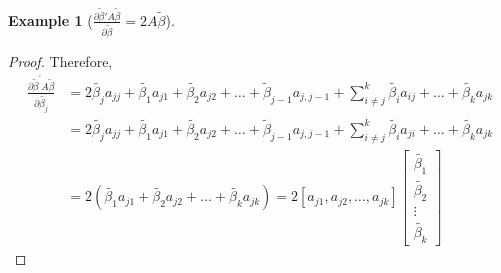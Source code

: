\documentclass[12pt, a4paper]{article}
\theoremstyle{definition}
\newtheorem{example}{Example}
\begin{document}
\begin{example}[$\frac{\partial \tilde{\beta}'A\tilde{\beta}}{\partial \tilde{\beta}}=2A\tilde{\beta}$]
\begin{proof}
 Therefore, 
 \begin{align*}
 \frac{\partial{\tilde{\beta}^{'}A\tilde{\beta}}}{\partial{\tilde{\beta_j}}} &=
 2\tilde{\beta_j}a_{jj}+\tilde{\beta_1}a_{j1}+\tilde{\beta_2}a_{j2}+\dots+\tilde{\beta}_{j-1}a_{j,j-1}+
 \sum\limits_{i\neq j}^k \tilde{\beta_i}a_{ij}+\dots+\tilde{\beta_k}a_{jk} \\
  &= 2\tilde{\beta_j}a_{jj}+\tilde{\beta_1}a_{j1}+\tilde{\beta_2}a_{j2}+\dots+\tilde{\beta}_{j-1}a_{j,j-1}+
 \sum\limits_{i\neq j}^k \tilde{\beta_i}a_{ji}+\dots+\tilde{\beta_k}a_{jk} \\
 &= 2(\tilde{\beta_1}a_{j1}+\tilde{\beta_2}a_{j2}+\dots+\tilde{\beta_k}a_{jk})=2[a_{j1},a_{j2},\dots,a_{jk}]
 \begin{bmatrix}
 \tilde{\beta_1}\\
 \tilde{\beta_2}\\
 \vdots\\
 \tilde{\beta_k}
 \end{bmatrix}
 \end{align*}
\end{proof}
\end{example}
\end{document}
